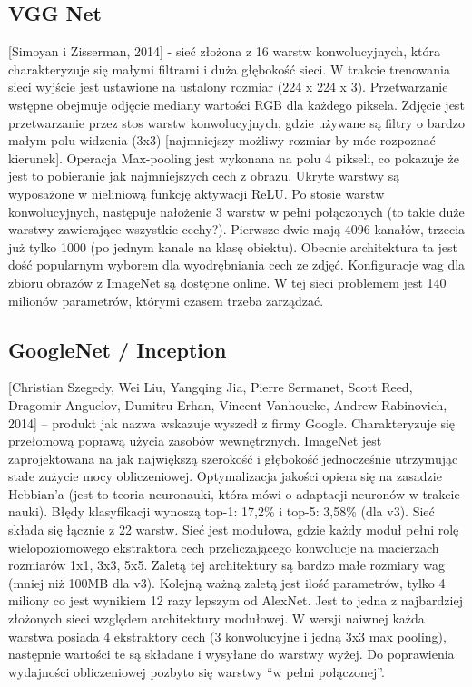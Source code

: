\documentclass[12pt,a4paper,twoside,titlepage,openright]{book}
\begin{document}
\subsection{VGG Net}
 [Simoyan i Zisserman, 2014] - sieć złożona z 16 warstw konwolucyjnych, która charakteryzuje się małymi filtrami i duża głębokość sieci.
W trakcie trenowania sieci wyjście jest ustawione na ustalony rozmiar (224 x 224 x 3). Przetwarzanie wstępne obejmuje odjęcie mediany wartości RGB dla każdego piksela. Zdjęcie jest przetwarzanie przez stos warstw konwolucyjnych, gdzie używane są filtry o bardzo małym polu widzenia (3x3) [najmniejszy możliwy rozmiar by móc rozpoznać kierunek]. Operacja Max-pooling jest wykonana na polu 4 pikseli, co pokazuje że jest to pobieranie jak najmniejszych cech z obrazu. Ukryte warstwy są wyposażone w nieliniową funkcję aktywacji ReLU. Po stosie warstw konwolucyjnych, następuje nałożenie 3 warstw w pełni połączonych (to takie duże warstwy zawierające wszystkie cechy?). Pierwsze dwie mają 4096 kanałów, trzecia już tylko 1000 (po jednym kanale na klasę obiektu). Obecnie architektura ta jest dość popularnym wyborem dla wyodrębniania cech ze zdjęć. Konfiguracje wag dla zbioru obrazów z ImageNet są dostępne online. W tej sieci problemem jest 140 milionów parametrów, którymi czasem trzeba zarządzać. \cite{DBLP:journals/corr/SimonyanZ14a}

\subsection{GoogleNet / Inception}
[Christian Szegedy, Wei Liu, Yangqing Jia, Pierre Sermanet, Scott Reed, Dragomir Anguelov, Dumitru Erhan, Vincent Vanhoucke, Andrew Rabinovich, 2014] -- produkt jak nazwa wskazuje wyszedł z firmy Google. Charakteryzuje się przełomową poprawą użycia zasobów wewnętrznych. ImageNet jest zaprojektowana na jak największą szerokość i głębokość jednocześnie utrzymując stałe zużycie mocy obliczeniowej. Optymalizacja jakości opiera się na zasadzie Hebbian’a (jest to teoria neuronauki, która mówi o adaptacji neuronów w trakcie nauki). Błędy klasyfikacji wynoszą top-1: 17,2\% i top-5: 3,58\% (dla v3). Sieć składa się łącznie z 22 warstw. Sieć jest modułowa, gdzie każdy moduł pełni rolę wielopoziomowego ekstraktora cech przeliczającego konwolucje na macierzach rozmiarów 1x1, 3x3, 5x5. Zaletą tej architektury są bardzo małe rozmiary wag (mniej niż 100MB dla v3). Kolejną ważną zaletą jest ilość parametrów, tylko 4 miliony co jest wynikiem 12 razy lepszym od AlexNet. Jest to jedna z najbardziej złożonych sieci względem architektury modułowej. W wersji naiwnej każda warstwa posiada 4 ekstraktory cech (3 konwolucyjne i jedną 3x3 max pooling), następnie wartości te są składane i wysyłane do warstwy wyżej. Do poprawienia wydajności obliczeniowej pozbyto się warstwy “w pełni połączonej”. \cite{DBLP:journals/corr/SzegedyLJSRAEVR14}
\end{document}
